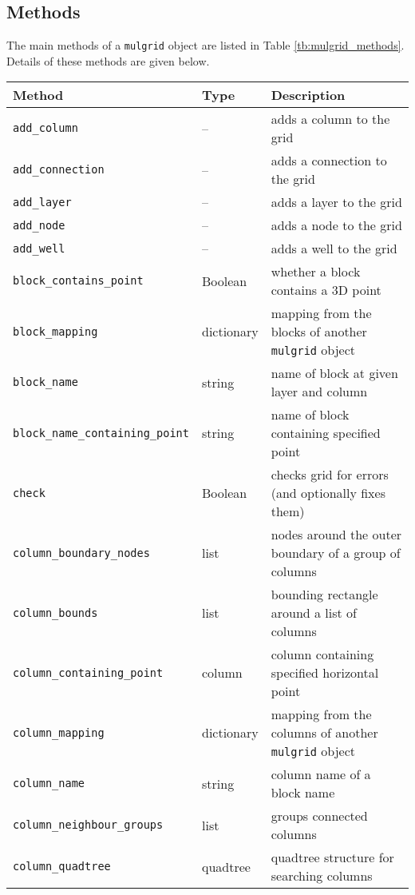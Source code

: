 \subsection{Methods}
\label{mulgridmethods}

The main methods of a \texttt{mulgrid} object are listed in Table \ref{tb:mulgrid_methods}.  Details of these methods are given below.

\begin{center}
\begin{longtable}{|l|l|p{70mm}|}
  \hline
  \textbf{Method} & \textbf{Type} & \textbf{Description}\\
  \hline
  \texttt{add\_column} & -- & adds a column to the grid\\ 
  \texttt{add\_connection} & -- & adds a connection to the grid\\ 
  \texttt{add\_layer} & -- & adds a layer to the grid\\ 
  \texttt{add\_node} & -- & adds a node to the grid\\ 
  \texttt{add\_well} & -- & adds a well to the grid\\ 
  \texttt{block\_contains\_point} & Boolean & whether a block contains a 3D point\\
  \texttt{block\_mapping} & dictionary & mapping from the blocks of another \texttt{mulgrid} object\\
  \texttt{block\_name} & string & name of block at given layer and column\\
  \texttt{block\_name\_containing\_point} & string & name of block containing specified point\\
  \texttt{check} & Boolean & checks grid for errors (and optionally fixes them)\\ 
  \texttt{column\_boundary\_nodes} & list & nodes around the outer boundary of a group of columns\\ 
  \texttt{column\_bounds} & list & bounding rectangle around a list of columns\\ 
  \texttt{column\_containing\_point} & column & column containing specified horizontal point\\ 
  \texttt{column\_mapping} & dictionary & mapping from the columns of another \texttt{mulgrid} object\\
  \texttt{column\_name} & string & column name of a block name\\ 
  \texttt{column\_neighbour\_groups} & list & groups connected columns\\ 
  \texttt{column\_quadtree} & quadtree & quadtree structure for searching columns\\ 

\end{longtable}
\end{center}
